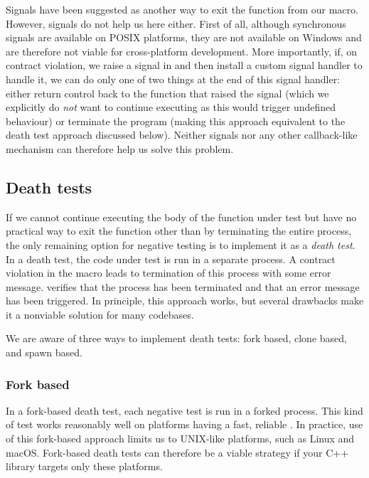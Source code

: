 Signals have been suggested as another way to exit the function from our  macro. However, signals do not help us here either. First of all, although synchronous signals are available on POSIX platforms, they are not available on Windows and are therefore not viable for cross-platform development. More importantly, if, on contract violation, we raise a signal in  and then install a custom signal handler to handle it, we can do only one of two things at the end of this signal handler: either return control back to the function that raised the signal (which we explicitly do \emph{not} want to continue executing as this would trigger undefined behaviour) or terminate the program (making this approach equivalent to the death test approach discussed below). Neither signals nor any other callback-like mechanism can therefore help us solve this problem.

\subsection{Death tests}
\label{subsec:deathtests}

If we cannot continue executing the body of the function under test but have no practical way to exit the function other than by terminating the entire process, the only remaining option for negative testing is to implement it as a \emph{death test}. In a death test, the code under test is run in a separate process. A contract violation in the  macro leads to termination of this process with some error message.  verifies that the process has been terminated and that an error message has been triggered. In principle, this approach works, but several drawbacks make it a nonviable solution for many codebases.

We are aware of three ways to implement death tests: fork based, clone based, and spawn based.

\subsubsection{Fork based}

In a fork-based death test, each negative test is run in a forked process. This kind of test works reasonably well on platforms having a fast, reliable . In practice, use of this fork-based approach limits us to UNIX-like platforms, such as Linux and macOS. Fork-based death tests can therefore be a viable strategy if your C++ library targets only these platforms.

